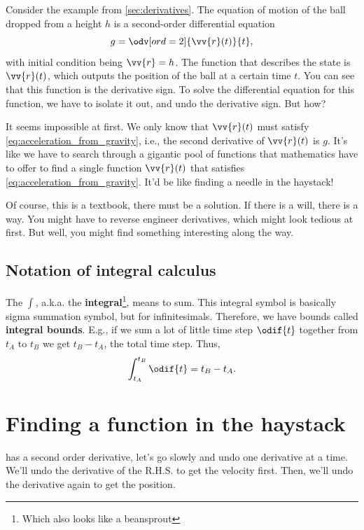 Consider the example from \cref{sec:derivatives}. The equation of motion of the ball dropped from a height $h$ is a second-order differential equation
\begin{equation}
	g = \odv[ord = 2]{\vv{r}(t)}{t}, \label{eq:acceleration_from_gravity}
\end{equation}
with initial condition being $\vv{r} = h$. The function that describes the state is $\vv{r}(t)$, which outputs the position of the ball at a certain time $t$. You can see that this function is the derivative sign. To solve the differential equation for this function, we have to isolate it out, and undo the derivative sign. But how?

It seems impossible at first. We only know that $\vv{r}(t)$ must satisfy \cref{eq:acceleration_from_gravity}, i.e., the second derivative of $\vv{r}(t)$ is $g$. It's like we have to search through a gigantic pool of functions that mathematics have to offer to find a single function $\vv{r}(t)$ that satisfies \cref{eq:acceleration_from_gravity}. It'd be like finding a needle in the haystack!

Of course, this is a textbook, there must be a solution. If there is a will, there is a way. You might have to reverse engineer derivatives, which might look tedious at first. But well, you might find something interesting along the way.

\subsection{Notation of integral calculus}
\label{sec:brief_notation_of_calculus_integral}

The $\int$, a.k.a. the \textbf{integral}\footnote{Which also looks like a beansprout}, means to sum. This integral symbol is basically sigma summation symbol, but for infinitesimals. Therefore, we have bounds called \textbf{integral bounds}. E.g., if we sum a lot of little time step $\odif{t}$ together from $t_A$ to $t_B$ we get $t_B - t_A$, the total time step. Thus,
\begin{equation}
	\int_{t_A}^{t_B}\odif{t} = t_B - t_A.
\end{equation}

\section{Finding a function in the haystack}
\label{sec:function_in_the_haystack}

 has a second order derivative, let's go slowly and undo one derivative at a time. We'll undo the derivative of the R.H.S. to get the velocity first. Then, we'll undo the derivative again to get the position.

